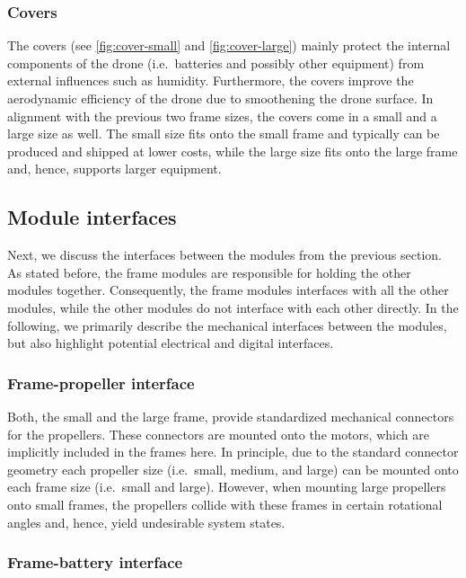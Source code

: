 \documentclass[sigconf,review]{acmart}
\begin{document}
\subsubsection*{Covers}
\label{sec:covers}

The covers (see \cref{fig:cover-small} and \cref{fig:cover-large}) mainly protect the internal components of the drone (i.e.\ batteries and possibly other equipment) from external influences such as humidity.
Furthermore, the covers improve the aerodynamic efficiency of the drone due to smoothening the drone surface.
In alignment with the previous two frame sizes, the covers come in a small and a large size as well.
The small size fits onto the small frame and typically can be produced and shipped at lower costs, while the large size fits onto the large frame and, hence, supports larger equipment.

\subsection{Module interfaces}
\label{sec:interfaces}

Next, we discuss the interfaces between the modules from the previous section.
As stated before, the frame modules are responsible for holding the other modules together.
Consequently, the frame modules interfaces with all the other modules, while the other modules do not interface with each other directly.
In the following, we primarily describe the mechanical interfaces between the modules, but also highlight potential electrical and digital interfaces.

\subsubsection*{Frame-propeller interface}

Both, the small and the large frame, provide standardized mechanical connectors for the propellers.
These connectors are mounted onto the motors, which are implicitly included in the frames here.
In principle, due to the standard connector geometry each propeller size (i.e.\ small, medium, and large) can be mounted onto each frame size (i.e.\ small and large).
However, when mounting large propellers onto small frames, the propellers collide with these frames in certain rotational angles and, hence, yield undesirable system states.

\subsubsection*{Frame-battery interface}
\end{document}
